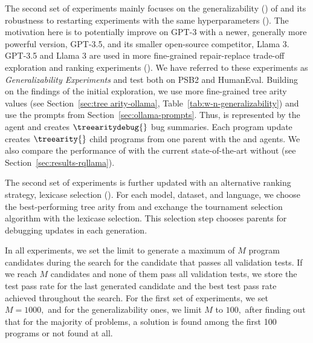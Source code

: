 The second set of experiments mainly focuses on the generalizability (\rqllama{}) of \method{}
and its robustness to restarting experiments with the same hyperparameters (\rqmultirun{}).
The motivation here is to potentially improve on GPT-3 with a newer, generally more powerful version, GPT-3.5, and its smaller open-source competitor, Llama 3.
GPT-3.5 and Llama 3 are used in more fine-grained repair-replace trade-off exploration and ranking experiments (\rqtreearity{}). 
We have referred to these experiments as \emph{\method{} Generalizability Experiments} and test \method{} both on PSB2 and HumanEval.
Building on the findings of the initial exploration, we use more fine-grained tree arity values (see Section~\ref{sec:tree arity-ollama}, Table~\ref{tab:w-n-generalizability}) and use the prompts from Section~\ref{sec:ollama-prompts}. 
Thus, \instruct{} is represented by the \instructllm{} agent and creates $\treearitydebug{}$ bug summaries.
Each program update creates $\treearity{}$ child programs from one parent with the \synthesize{} and \debug{} agents.
We also compare the performance of \method{} with the current state-of-the-art without \method{} (see Section~\ref{sec:results-rqllama}).

The second set of experiments is further updated with an alternative ranking strategy, lexicase selection (\rqlexicase{}). 
For each model, dataset, and language, we choose the best-performing tree arity from \rqllama{} and exchange the tournament selection algorithm with the lexicase selection. 
This selection step chooses parents for debugging updates in each generation. 


In all experiments, we set the limit to generate a maximum of $M$ program candidates during the search for the candidate that passes all validation tests. 
If we reach $M$ candidates and none of them pass all validation tests, we store the test pass rate for the last generated candidate and the best test pass rate achieved throughout the search. 
For the first set of experiments, we set $M = 1000,$ and for the generalizability ones, we limit $M$  to $100,$ after finding out that for the majority of problems, a solution is found among the first 100 programs or not found at all.



